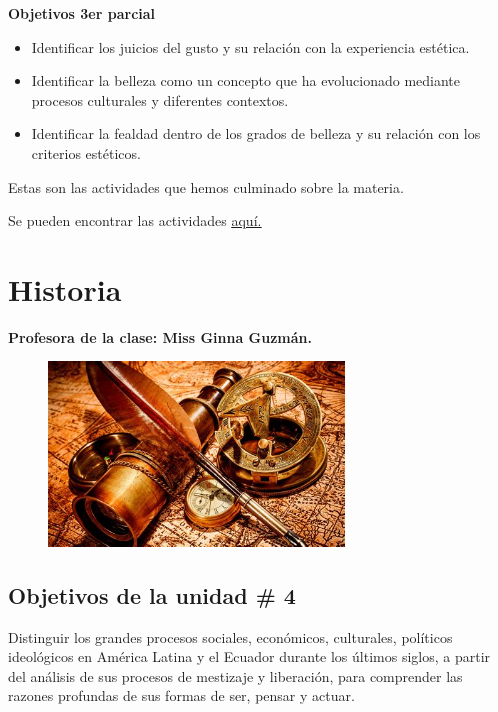 \documentclass[a4paper, 12pt]{article}
\begin{document}
\textbf{Objetivos 3er parcial}

\begin{itemize}

  \item Identificar los juicios del gusto y su relación con la experiencia estética.
  \item Identificar la belleza como un concepto que ha evolucionado mediante procesos culturales y diferentes contextos.
  \item Identificar la fealdad dentro de los grados de belleza y su relación con los criterios estéticos.

\end{itemize}

Estas son las actividades que hemos culminado sobre la materia.

Se pueden encontrar las actividades \href{https://drive.google.com/drive/folders/1h1XjvVwmMZPTBrb_DGk4VFDaQa4U9lXx?usp=sharing}{\underline{aquí.}}

\section{Historia}

\textbf{Profesora de la clase: Miss Ginna Guzmán.}

\begin{figure}[h]
  \includegraphics[width=0.7\textwidth, center]{historia.jpeg}
\end{figure}


\subsection{Objetivos de la unidad \# 4}

Distinguir los grandes procesos sociales, económicos, culturales, políticos
ideológicos en América Latina y el Ecuador durante los últimos siglos, a partir del análisis de sus procesos de mestizaje y liberación, para comprender las razones profundas de sus formas de ser, pensar y actuar.
\end{document}
